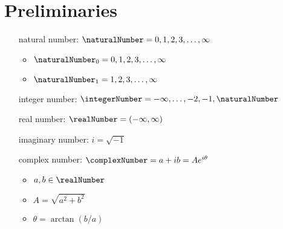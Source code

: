 \section*{Preliminaries}
\begin{itemize}
  \item [natural number:] $\naturalNumber = 0, 1, 2, 3, \dotsc, \infty$
    \begin{itemize}
    \item $\naturalNumber_0 = 0, 1, 2, 3, \dotsc, \infty$
    \item $\naturalNumber_1 = 1, 2, 3, \dotsc, \infty$
    \end{itemize}

  \item [integer number:] $\integerNumber = -\infty, \dotsc, -2, -1,
    \naturalNumber$
  \item [real number:] $\realNumber = (-\infty, \infty) $
  \item [imaginary number:] $i = \sqrt{-1}$
  \item [complex number:] $\complexNumber = a + ib = Ae^{i\theta}$
    \begin{itemize}
    \item $a, b \in \realNumber$
    \item $A = \sqrt{a^2 + b^2}$
    \item $\theta = \arctan(b/a)$
    \end{itemize}
\end{itemize}

